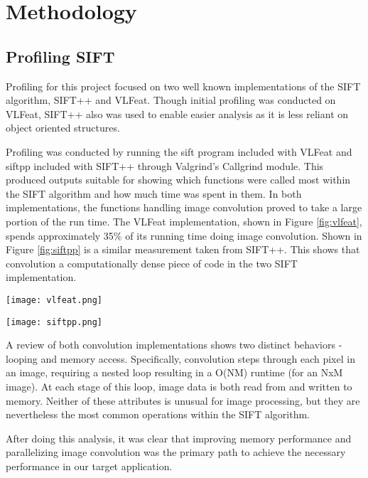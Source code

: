 \section{Methodology}
\subsection{Profiling SIFT}
Profiling for this project focused on two well known implementations of the SIFT algorithm, SIFT++ and VLFeat. Though initial profiling was conducted on VLFeat, SIFT++ also was used to enable easier analysis as it is less reliant on object oriented structures.

Profiling was conducted by running the sift program included with VLFeat and siftpp included with SIFT++ through Valgrind's Callgrind module. This produced outputs suitable for showing which functions were called most within the SIFT algorithm and how much time was spent in them. In both implementations, the functions handling image convolution proved to take a large portion of the run time. The VLFeat implementation, shown in Figure \ref{fig:vlfeat}, spends approximately 35\% of its running time doing image convolution. Shown in Figure \ref{fig:siftpp} is a similar measurement taken from SIFT++.  This shows that convolution a computationally dense piece of code in the two SIFT implementation.

\begin{center}
\texttt{[image: vlfeat.png]}%
\label{fig:vlfeat}%
\end{center}

\begin{center}
\texttt{[image: siftpp.png]}%
\label{fig:siftpp}%
\end{center}

A review of both convolution implementations shows two distinct behaviors - looping and memory access. Specifically, convolution steps through each pixel in an image, requiring a nested loop resulting in a O(NM) runtime (for an NxM image). At each stage of this loop, image data is both read from and written to memory. Neither of these attributes is unusual for image processing, but they are nevertheless the most common operations within the SIFT algorithm. 

After doing this analysis, it was clear that improving memory performance and parallelizing image convolution was the primary path to achieve the necessary performance in our target application.


